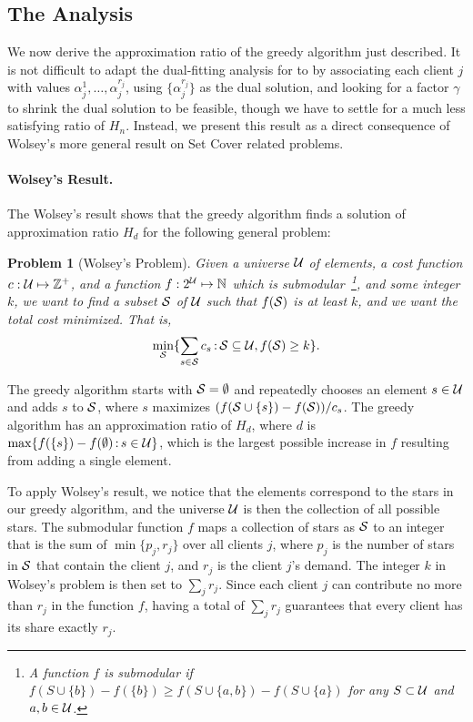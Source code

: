 \documentclass[oneside,final]{ucr}
\newtheorem{problem}[theorem]{Problem}
\begin{document}
\subsection{The Analysis}
We now derive the approximation ratio of the greedy
algorithm just described. It is not difficult to adapt the
dual-fitting analysis for {\UFL} to {\FTFP} by associating
each client $j$ with values
$\alpha_j^1,\ldots,\alpha_j^{r_j}$, using
$\{\alpha_j^{r_j}\}$ as the dual solution, and looking for a
factor $\gamma$ to shrink the dual solution to be feasible,
though we have to settle for a much less satisfying ratio of
$H_n$. Instead, we present this result as a direct
consequence of Wolsey's more general result on Set Cover
related problems.

\paragraph{Wolsey's Result.}
The Wolsey's result shows that the greedy algorithm finds a
solution of approximation ratio $H_d$ for the following
general problem:

\begin{problem}[Wolsey's Problem]
  Given a universe $\calU$ of elements, a cost function $c:
  \calU \mapsto \mathbb{Z}^+$, and a function $f : 2^\calU
  \mapsto \mathbb{N}$ which is submodular~\footnote{A
    function $f$ is submodular if $f(S \cup \{b\}) -
    f(\{b\}) \geq f(S \cup \{a,b\}) - f (S \cup \{a\})$ for
    any $S \subset \calU$ and $a, b \in \calU$.}, and some
  integer $k$, we want to find a subset $\calS$ of $\calU$
  such that $f(\calS)$ is at least $k$, and we want the
  total cost minimized. That is,
\begin{equation*}
  \min_{\calS} \{ \sum_{s\in\calS} c_s \suchthat
  \calS\subseteq \calU, f(\calS) \geq k\}.
\end{equation*}
\end{problem}

The greedy algorithm starts with $\calS = \emptyset$ and
repeatedly chooses an element $s \in \calU$ and adds $s$ to
$\calS$, where $s$ maximizes $(f(\calS \cup \{s\}) -
f(\calS)) / c_s$. The greedy algorithm has an approximation
ratio of $H_d$, where $d$ is $\max\{f(\{s\}) - f(\emptyset)
\suchthat s \in \calU\}$, which is the largest possible
increase in $f$ resulting from adding a single element.

To apply Wolsey's result, we notice that the elements
correspond to the stars in our greedy algorithm, and the
universe $\calU$ is then the collection of all possible
stars. The submodular function $f$ maps a collection of
stars as $\calS$ to an integer that is the sum of
$\min\{p_j, r_j\}$ over all clients $j$, where $p_j$ is the
number of stars in $\calS$ that contain the client $j$, and
$r_j$ is the client $j$'s demand. The integer $k$ in
Wolsey's problem is then set to $\sum_{j} r_j$. Since each
client $j$ can contribute no more than $r_j$ in the function
$f$, having a total of $\sum_j r_j$ guarantees that every
client has its share exactly $r_j$.
\end{document}
